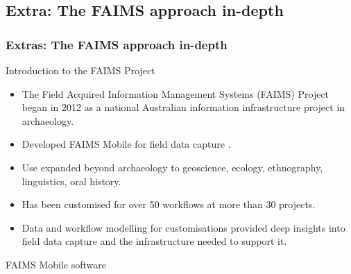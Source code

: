 \documentclass[
	aspectratio=169, %
	12pt, %
	t, %
]{beamer}
\begin{document}
\begin{refsegment}
\section{Extra: The FAIMS approach in-depth}

\begin{sectionframe} %
	\frametitle{Extras: The FAIMS approach in-depth}


\end{sectionframe}


\begin{frame}{Introduction to the FAIMS Project}
    \begin{itemize}
        \item The Field Acquired Information Management Systems (FAIMS) Project began in 2012 as a national Australian information infrastructure project in archaeology.
        \item Developed FAIMS Mobile for field data capture \parencite{Ballsun-Stanton2018-zd}.
        \item Use expanded beyond archaeology to geoscience, ecology, ethnography, linguistics, oral history.
        \item Has been customised for over 50 workflows at more than 30 projects. 
        \item Data and workflow modelling for customisations provided deep insights into field data capture and the infrastructure needed to support it.
    \end{itemize}
\end{frame}
\begin{frame}{FAIMS Mobile software}
 \begin{figure}[H]
    \centering
    \vspace{-0.5cm}

\end{figure}
\end{frame}
\end{refsegment}
\end{document}
